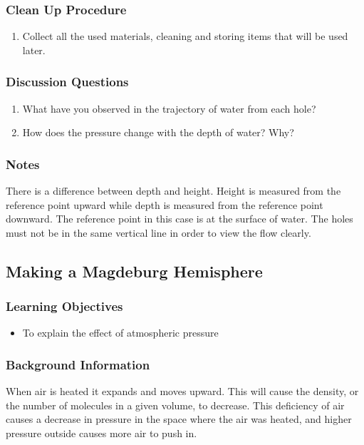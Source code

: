 \subsubsection*{Clean Up Procedure}
\begin{enumerate}
\item{Collect all the used materials, cleaning and storing items that will be used later. } 
\end{enumerate}

\subsubsection*{Discussion Questions}
\begin{enumerate}
\item{What have you observed in the trajectory of water from each hole?}
\item{How does the pressure change with the depth of water? Why?}
\end{enumerate}

\subsubsection*{Notes}
There is a difference between depth and height. Height is measured from the reference point upward while depth is measured from the reference point downward. The reference point in this case is at the surface of water. The holes must not be in the same vertical line in order to view the flow clearly. 

\subsection{Making a Magdeburg Hemisphere}

\subsubsection*{Learning Objectives}
\begin{itemize}
\item{To explain the effect of atmospheric pressure} 
\end{itemize}

\subsubsection*{Background Information}
When air is heated it expands and moves upward. This will cause the density, or the number of molecules in a given volume, to decrease. This deficiency of air causes a decrease in pressure in the space where the air was heated, and higher pressure outside causes more air to push in.

